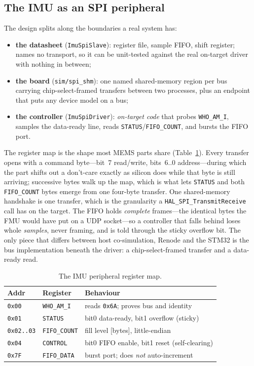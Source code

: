 \documentclass[preprint,12pt,a4paper]{elsarticle}
\newcommand{\code}[1]{\texttt{\small #1}}
\begin{document}
\subsection{The IMU as an SPI peripheral}
The design splits along the boundaries a real system has:
\begin{itemize}
  \item \textbf{the datasheet} (\code{ImuSpiSlave}): register file, sample FIFO,
        shift register; names no transport, so it can be unit-tested against the
        real on-target driver with nothing in between;
  \item \textbf{the board} (\code{sim/spi\_shm}): one named shared-memory region
        per bus carrying chip-select-framed transfers between two processes,
        plus an endpoint that puts any device model on a bus;
  \item \textbf{the controller} (\code{ImuSpiDriver}): \emph{on-target code}
        that probes \code{WHO\_AM\_I}, samples the data-ready line, reads
        \code{STATUS}/\code{FIFO\_COUNT}, and bursts the FIFO port.
\end{itemize}
The register map is the shape most MEMS parts share (Table~\ref{tab:regmap}).
Every transfer opens with a command byte---bit~7 read/write, bits~6..0
address---during which the part shifts out a don't-care exactly as silicon does
while that byte is still arriving; successive bytes walk up the map, which is
what lets \code{STATUS} and both \code{FIFO\_COUNT} bytes emerge from one
four-byte transfer. One shared-memory handshake is one transfer, which is the
granularity a \code{HAL\_SPI\_TransmitReceive} call has on the target. The FIFO
holds \emph{complete} frames---the identical bytes the FMU would have put on a
UDP socket---so a controller that falls behind loses whole \emph{samples}, never
framing, and is told through the sticky overflow bit. The only piece that
differs between host co-simulation, Renode and the STM32 is the bus
implementation beneath the driver: a chip-select-framed transfer and a data-ready
read.

\begin{table}[tbp]
\centering
\caption{The IMU peripheral register map.}
\label{tab:regmap}
\footnotesize
\setlength{\tabcolsep}{4pt}
\begin{tabular}{@{}lll@{}}
\toprule
Addr & Register & Behaviour\\
\midrule
\code{0x00} & \code{WHO\_AM\_I}  & reads \code{0x6A}; proves bus and identity\\
\code{0x01} & \code{STATUS}      & bit0 data-ready, bit1 overflow (sticky)\\
\code{0x02..03} & \code{FIFO\_COUNT} & fill level [bytes], little-endian\\
\code{0x04} & \code{CONTROL}     & bit0 FIFO enable, bit1 reset (self-clearing)\\
\code{0x7F} & \code{FIFO\_DATA}  & burst port; does \emph{not} auto-increment\\
\bottomrule
\end{tabular}
\end{table}
\end{document}
